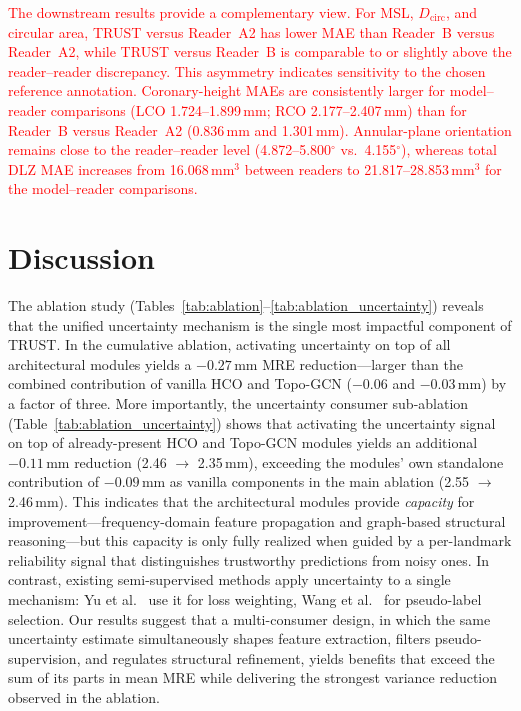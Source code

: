 \documentclass[conference]{IEEEtran}
\begin{document}
\textcolor{red}{The downstream results provide a complementary view. For MSL, $D_{\text{circ}}$, and circular area, TRUST versus Reader~A2 has lower MAE than Reader~B versus Reader~A2, while TRUST versus Reader~B is comparable to or slightly above the reader--reader discrepancy. This asymmetry indicates sensitivity to the chosen reference annotation. Coronary-height MAEs are consistently larger for model--reader comparisons (LCO 1.724--1.899\,mm; RCO 2.177--2.407\,mm) than for Reader~B versus Reader~A2 (0.836\,mm and 1.301\,mm). Annular-plane orientation remains close to the reader--reader level (4.872--5.800$^\circ$ vs.\ 4.155$^\circ$), whereas total DLZ MAE increases from 16.068\,mm$^3$ between readers to 21.817--28.853\,mm$^3$ for the model--reader comparisons.}


\section{Discussion}
\label{sec:discussion}

The ablation study (Tables~\ref{tab:ablation}--\ref{tab:ablation_uncertainty}) reveals that the unified uncertainty mechanism is the single most impactful component of TRUST. In the cumulative ablation, activating uncertainty on top of all architectural modules yields a $-0.27$\,mm MRE reduction---larger than the combined contribution of vanilla HCO and Topo-GCN ($-0.06$ and $-0.03$\,mm) by a factor of three. More importantly, the uncertainty consumer sub-ablation (Table~\ref{tab:ablation_uncertainty}) shows that activating the uncertainty signal on top of already-present HCO and Topo-GCN modules yields an additional $-0.11$\,mm reduction (2.46 $\to$ 2.35\,mm), exceeding the modules' own standalone contribution of $-0.09$\,mm as vanilla components in the main ablation (2.55 $\to$ 2.46\,mm). This indicates that the architectural modules provide \emph{capacity} for improvement---frequency-domain feature propagation and graph-based structural reasoning---but this capacity is only fully realized when guided by a per-landmark reliability signal that distinguishes trustworthy predictions from noisy ones. In contrast, existing semi-supervised methods apply uncertainty to a single mechanism: Yu et al.~\cite{Yu2019_uncertainty_aware} use it for loss weighting, Wang et al.~\cite{Wang2022_u2pl} for pseudo-label selection. Our results suggest that a multi-consumer design, in which the same uncertainty estimate simultaneously shapes feature extraction, filters pseudo-supervision, and regulates structural refinement, yields benefits that exceed the sum of its parts in mean MRE while delivering the strongest variance reduction observed in the ablation.
\end{document}
